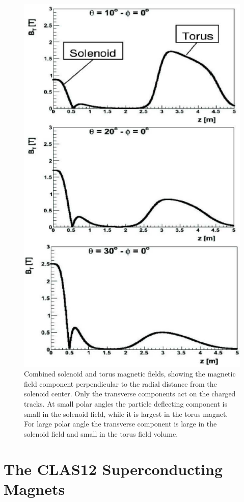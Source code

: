 \documentclass[final,3p]{elsarticle}
\begin{document}
\begin{twocolumn}
\begin{figure}[htbp!]
\centerline{\includegraphics[width=0.7\columnwidth]{magfield.png}}
\caption{Combined solenoid and torus magnetic fields, showing the magnetic field component perpendicular to the
  radial distance from the solenoid center. Only the transverse components act on the charged tracks. At small polar
  angles the particle deflecting component is small in the solenoid field, while it is largest in the torus magnet. For
  large polar angle the transverse component is large in the solenoid field and small in the torus field volume.} 
\label{solenoid-torus}
\end{figure}

\section{The CLAS12 Superconducting Magnets}


\end{twocolumn}
\end{document}
